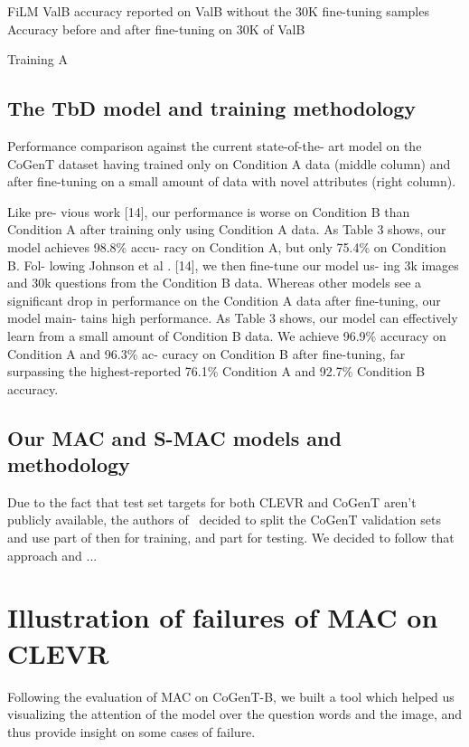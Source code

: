 FiLM ValB accuracy reported on ValB without the 30K fine-tuning samples 
Accuracy before and after fine-tuning on 30K of ValB

Training A


\subsection{The TbD model and training methodology}

Performance comparison against the current state-of-the-
art model on the CoGenT dataset having trained only on Condition
A data (middle column) and after fine-tuning on a small amount
of data with novel attributes (right column).

Like pre-
vious  work  [14],  our  performance  is  worse  on  Condition
B than Condition A after training only using Condition A
data.  As Table 3 shows, our model achieves 98.8\% accu-
racy on Condition A, but only 75.4\% on Condition B. Fol-
lowing Johnson
et al
. [14], we then fine-tune our model us-
ing 3k images and 30k questions from the Condition B data.
Whereas other models see a significant drop in performance
on the Condition A data after fine-tuning, our model main-
tains high performance.  As Table 3 shows, our model can
effectively learn from a small amount of Condition B data.
We achieve 96.9\% accuracy on Condition A and 96.3\% ac-
curacy on Condition B after fine-tuning, far surpassing the
highest-reported 76.1\% Condition A and 92.7\% Condition
B accuracy.


\subsection{Our MAC and S-MAC models and methodology}

Due to the fact that test set targets for both CLEVR and CoGenT aren't publicly available, the authors of~\cite{mascharka2018transparency} decided to split
the CoGenT validation sets and use part of then for training, and part for testing. 
We decided to follow that approach and ...   




\section{Illustration of failures of MAC on CLEVR}
Following the evaluation of MAC on CoGenT-B, we built a tool which helped us visualizing the attention of the model over the question words and the image, and thus provide insight on some cases of failure.


